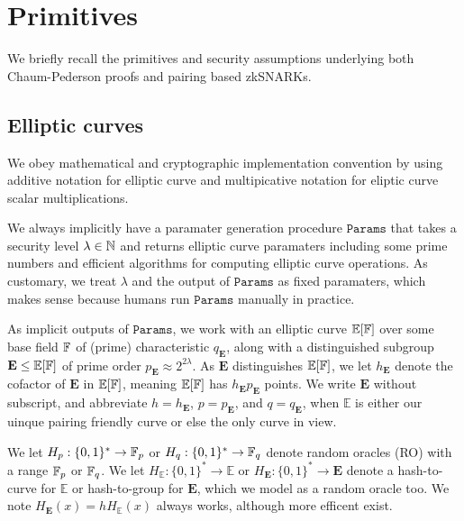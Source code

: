 
\section{Primitives}
\label{sec:lambda}

\def\ecE{{\mathbb{E}}}
\def\grE{{\mathbf{E}}}
\def\genE{E}
\def\genG{G}
\def\genB{K} %

\def\ecJ{{\mathbb{J}}}
\def\grJ{{\mathbf{J}}}
\def\genJ{J}

We briefly recall the primitives and security assumptions underlying both Chaum-Pederson proofs and pairing based zkSNARKs. 


\subsection{Elliptic curves}

We obey mathematical and cryptographic implementation convention by using additive notation for elliptic curve and multipicative notation for eliptic curve scalar multiplications. 

We always implicitly have a paramater generation procedure $\mathtt{Params}$ that takes a security level $\lambda \in \mathbb{N}$ and returns elliptic curve paramaters including some prime numbers and efficient algorithms for computing elliptic curve operations.  As customary, we treat $\lambda$ and the output of $\mathtt{Params}$ as fixed paramaters, which makes sense because humans run $\mathtt{Params}$ manually in practice. 

As implicit outputs of $\mathtt{Params}$, we work with an elliptic curve $\ecE[\F]$ over some base field $\mathbb{F}$ of (prime) characteristic $q_{\grE}$, along with a distinguished subgroup $\grE \le \ecE[\F]$ of prime order $p_{\grE} \approx 2^{2\lambda}$.  As $\grE$ distinguishes $\ecE[\F]$, we let $h_{\grE}$ denote the cofactor of $\grE$ in $\ecE[\F]$, meaning $\ecE[\F]$ has $h_{\grE} p_{\grE}$ points.
We write $\grE$ without subscript, and abbreviate $h = h_{\grE}$, $p = p_{\grE}$, and $q = q_{\grE}$, when $\ecE$ is either our uinque pairing friendly curve or else the only curve in view.

We let $H_p : \{0,1\}^* \to \mathbb{F}_p$ or $H_q : \{0,1\}^* \to \mathbb{F}_q$ denote random oracles (RO) with a range $\mathbb{F}_p$ or $\mathbb{F}_q$.  We let $H_\ecE : \{0,1\}^* \to \ecE$ or $H_\grE : \{0,1\}^* \to \grE$ denote a hash-to-curve for $\ecE$ or hash-to-group for $\grE$, which we model as a random oracle too.  We note $H_\grE(x) = h H_\ecE(x)$ always works, although more efficent exist.

